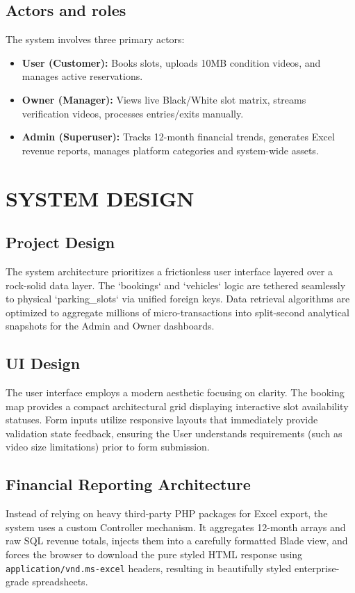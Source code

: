 \documentclass[12pt,a4paper]{report}
\begin{document}
\section{Actors and roles}
The system involves three primary actors:
\begin{itemize}
    \item \textbf{User (Customer):} Books slots, uploads 10MB condition videos, and manages active reservations.
    \item \textbf{Owner (Manager):} Views live Black/White slot matrix, streams verification videos, processes entries/exits manually.
    \item \textbf{Admin (Superuser):} Tracks 12-month financial trends, generates Excel revenue reports, manages platform categories and system-wide assets.
\end{itemize}

\chapter{SYSTEM DESIGN}

\section{Project Design}
The system architecture prioritizes a frictionless user interface layered over a rock-solid data layer. The `bookings` and `vehicles` logic are tethered seamlessly to physical `parking_slots` via unified foreign keys. Data retrieval algorithms are optimized to aggregate millions of micro-transactions into split-second analytical snapshots for the Admin and Owner dashboards.

\section{UI Design}
The user interface employs a modern aesthetic focusing on clarity. The booking map provides a compact architectural grid displaying interactive slot availability statuses. Form inputs utilize responsive layouts that immediately provide validation state feedback, ensuring the User understands requirements (such as video size limitations) prior to form submission.

\section{Financial Reporting Architecture}
Instead of relying on heavy third-party PHP packages for Excel export, the system uses a custom Controller mechanism. It aggregates 12-month arrays and raw SQL revenue totals, injects them into a carefully formatted Blade view, and forces the browser to download the pure styled HTML response using \texttt{application/vnd.ms-excel} headers, resulting in beautifully styled enterprise-grade spreadsheets.
\end{document}
